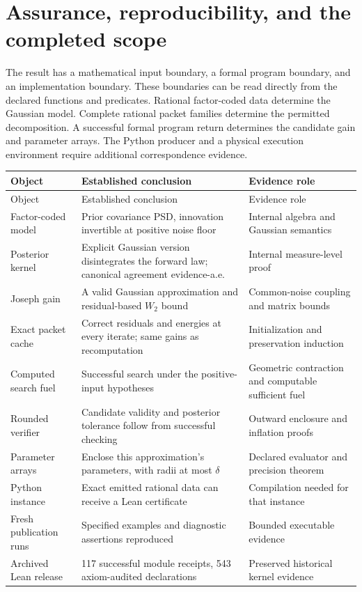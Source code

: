 \section{Assurance, reproducibility, and the completed scope}\label{sec:assurance}
The result has a mathematical input boundary, a formal program boundary, and an implementation boundary. These boundaries can be read directly from the declared functions and predicates. Rational factor-coded data determine the Gaussian model. Complete rational packet families determine the permitted decomposition. A successful formal program return determines the candidate gain and parameter arrays. The Python producer and a physical execution environment require additional correspondence evidence.

\begin{longtable}{p{.23\linewidth}p{.40\linewidth}p{.27\linewidth}}
\toprule
Object & Established conclusion & Evidence role\\
\midrule
\endfirsthead
\toprule
Object & Established conclusion & Evidence role\\
\midrule
\endhead
Factor-coded model & Prior covariance PSD, innovation invertible at positive noise floor & Internal algebra and Gaussian semantics\\
Posterior kernel & Explicit Gaussian version disintegrates the forward law; canonical agreement evidence-a.e. & Internal measure-level proof\\
Joseph gain & A valid Gaussian approximation and residual-based $W_2$ bound & Common-noise coupling and matrix bounds\\
Exact packet cache & Correct residuals and energies at every iterate; same gains as recomputation & Initialization and preservation induction\\
Computed search fuel & Successful search under the positive-input hypotheses & Geometric contraction and computable sufficient fuel\\
Rounded verifier & Candidate validity and posterior tolerance follow from successful checking & Outward enclosure and inflation proofs\\
Parameter arrays & Enclose this approximation's parameters, with radii at most $\delta$ & Declared evaluator and precision theorem\\
Python instance & Exact emitted rational data can receive a Lean certificate & Compilation needed for that instance\\
Fresh publication runs & Specified examples and diagnostic assertions reproduced & Bounded executable evidence\\
Archived Lean release & 117 successful module receipts, 543 axiom-audited declarations & Preserved historical kernel evidence\\
\bottomrule
\end{longtable}

